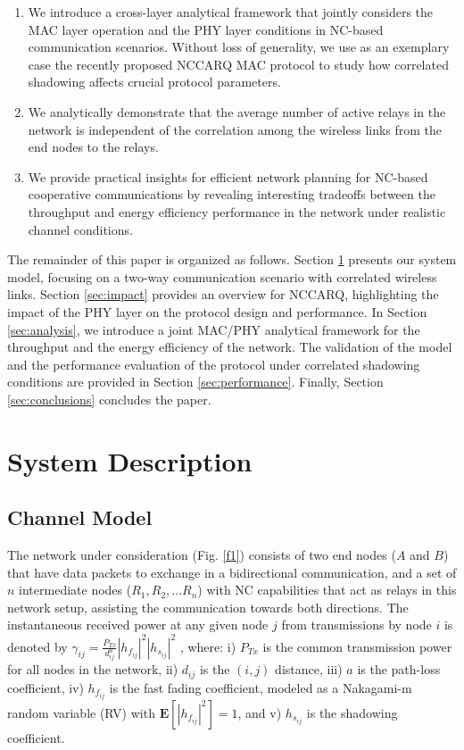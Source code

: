 \documentclass[12pt,draftcls, onecolumn]{IEEEtran}
\begin{document}
\begin{enumerate}
\item We introduce a cross-layer analytical framework that jointly considers the MAC layer operation and the PHY layer conditions in NC-based communication scenarios. Without loss of generality, we use as an exemplary case the recently proposed NCCARQ MAC protocol \cite{nccarq} to study how correlated shadowing affects crucial protocol parameters.
\item We analytically demonstrate that the average number of active relays in the network is independent of the correlation among the wireless links from the end nodes to the relays.
\item We provide practical insights for efficient network planning for NC-based cooperative communications by revealing interesting tradeoffs between the throughput and energy efficiency performance in the network under realistic channel conditions.
\end{enumerate}

The remainder of this paper is organized as follows. Section \ref{sec:system} presents our system model, focusing on a two-way communication scenario with correlated wireless links. Section \ref{sec:impact} provides an overview for NCCARQ, highlighting the impact of the PHY layer on the protocol design and performance. In Section \ref{sec:analysis}, we introduce a joint MAC/PHY analytical framework for the throughput and the energy efficiency of the network. The validation of the model and the performance evaluation of the protocol under correlated shadowing conditions are provided in Section \ref{sec:performance}. Finally, Section \ref{sec:conclusions} concludes the paper.

\section{System Description}
\label{sec:system}

\subsection{Channel Model}
\label{sec:channel}

The network under consideration (Fig. \ref{f1}) consists of two end nodes ($A$ and $B$) that have data packets to exchange in a bidirectional communication, and a set of $n$ intermediate nodes ($R_1,R_2,...R_n$) with NC capabilities that act as relays in this network setup, assisting the communication towards both directions. The instantaneous received power at any given node $j$ from transmissions by node $i$ is denoted by $\gamma_{ij}=\frac{P_{Tx}}{d_{ij}^a} \left|h_{f_{ij}}\right|^2\left|h_{s_{ij}}\right|^2$ \cite[Eq. (1.1)]{thesismary}, where: i) $P_{Tx}$ is the common transmission power for all nodes in the network, ii) $d_{ij}$ is the $(i,j)$ distance, iii) $a$ is the path-loss coefficient, iv) $h_{f_{ij}}$ is the fast fading coefficient, modeled as a Nakagami-m random variable (RV) with $\mathbf{E}\left[\left|h_{f_{ij}}\right|^2\right]=1$, and v) $h_{s_{ij}}$ is the shadowing coefficient.
\end{document}
